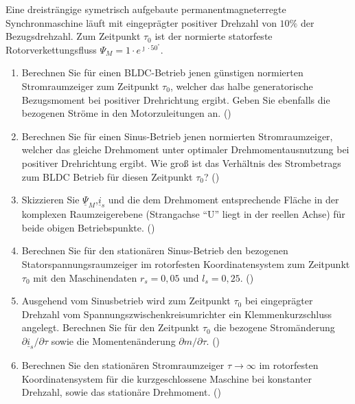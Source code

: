 \begin{question}[topic=psm,type=exam,tags={20131203}]
Eine dreisträngige symetrisch aufgebaute permanentmagneterregte Synchronmaschine läuft mit eingeprägter positiver Drehzahl von $10\%$ der Bezugsdrehzahl. Zum Zeitpunkt $\tau_0$ ist der normierte statorfeste Rotorverkettungsfluss $\Psi_M = 1 \cdot e^{\jmath \cdot 50 ^\circ}$.
\begin{enumerate}
\item Berechnen Sie für einen BLDC-Betrieb jenen günstigen normierten Stromraumzeiger zum Zeitpunkt $\tau_0$, welcher das halbe generatorische Bezugsmoment bei positiver Drehrichtung ergibt. Geben Sie ebenfalls die bezogenen Ströme in den Motorzuleitungen an. ()
\item Berechnen Sie für einen Sinus-Betrieb jenen normierten Stromraumzeiger, welcher das gleiche Drehmoment unter optimaler Drehmomentausnutzung bei positiver Drehrichtung ergibt. Wie groß ist das Verhältnis des Strombetrags zum BLDC Betrieb für diesen Zeitpunkt $\tau_0$? ()
\item Skizzieren Sie $\underline{\Psi}_M$,$\underline{i}_s$ und die dem Drehmoment entsprechende Fläche in der komplexen Raumzeigerebene (Strangachse "`U"' liegt in der reellen Achse) für beide obigen Betriebspunkte. ()
\item Berechnen Sie für den stationären Sinus-Betrieb den bezogenen Statorspannungsraumzeiger im rotorfesten Koordinatensystem zum Zeitpunkt $\tau_0$ mit den Maschinendaten $r_s = 0,05$ und $l_s = 0,25$. ()
\item Ausgehend vom Sinusbetrieb wird zum Zeitpunkt $\tau_0$ bei eingeprägter Drehzahl vom Spannungszwischenkreisumrichter ein Klemmenkurzschluss angelegt. Berechnen Sie für den Zeitpunkt $\tau_0$ die bezogene Stromänderung $\partial \underline{i}_s/\partial \tau$ sowie die Momentenänderung $\partial m/\partial \tau$. ()
\item Berechnen Sie den stationären Stromraumzeiger $ \tau \rightarrow \infty$ im rotorfesten Koordinatensystem für die kurzgeschlossene Maschine bei konstanter Drehzahl, sowie das stationäre Drehmoment. ()
\end{enumerate}
\end{question}
